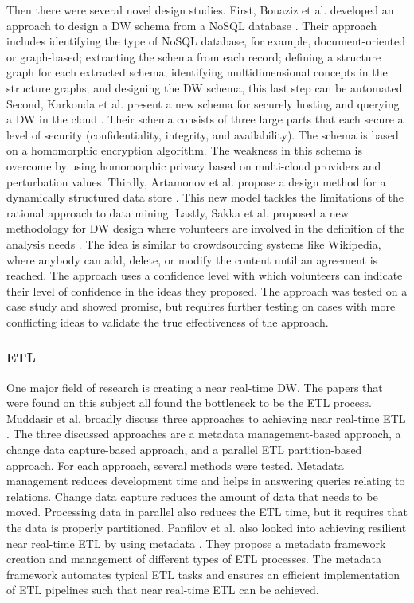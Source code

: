 \documentclass[11pt]{article}
\begin{document}
Then there were several novel design studies. First, Bouaziz et al. developed an approach to design a DW schema from a NoSQL database \cite{Bouaziz2019221}. Their approach includes identifying the type of NoSQL database, for example, document-oriented or graph-based; extracting the schema from each record; defining a structure graph for each extracted schema; identifying multidimensional concepts in the structure graphs; and designing the DW schema, this last step can be automated. Second, Karkouda et al. present a new schema for securely hosting and querying a DW in the cloud \cite{Karkouda20186}. Their schema consists of three large parts that each secure a level of security (confidentiality, integrity, and availability). The schema is based on a homomorphic encryption algorithm. The weakness in this schema is overcome by using homomorphic privacy based on multi-cloud providers and perturbation values. Thirdly, Artamonov et al. propose a design method for a dynamically structured data store \cite{Artamonov2019794}. This new model tackles the limitations of the rational approach to data mining. Lastly, Sakka et al. proposed a new methodology for DW design where volunteers are involved in the definition of the analysis needs \cite{Sakka2018286}. The idea is similar to crowdsourcing systems like Wikipedia, where anybody can add, delete, or modify the content until an agreement is reached. The approach uses a confidence level with which volunteers can indicate their level of confidence in the ideas they proposed. The approach was tested on a case study and showed promise, but requires further testing on cases with more conflicting ideas to validate the true effectiveness of the approach. \\

\subsubsection{ETL}
One major field of research is creating a near real-time DW. The papers that were found on this subject all found the bottleneck to be the ETL process. Muddasir et al. broadly discuss three approaches to achieving near real-time ETL \cite{MohammedMuddasir2018436}. The three discussed approaches are a metadata management-based approach, a change data capture-based approach, and a parallel ETL partition-based approach. For each approach, several methods were tested. Metadata management reduces development time and helps in answering queries relating to relations. Change data capture reduces the amount of data that needs to be moved. Processing data in parallel also reduces the ETL time, but it requires that the data is properly partitioned. Panfilov et al. also looked into achieving resilient near real-time ETL by using metadata \cite{Panfilov2021139}. They propose a metadata framework creation and management of different types of ETL processes. The metadata framework automates typical ETL tasks and ensures an efficient implementation of ETL pipelines such that near real-time ETL can be achieved. \\
\end{document}
